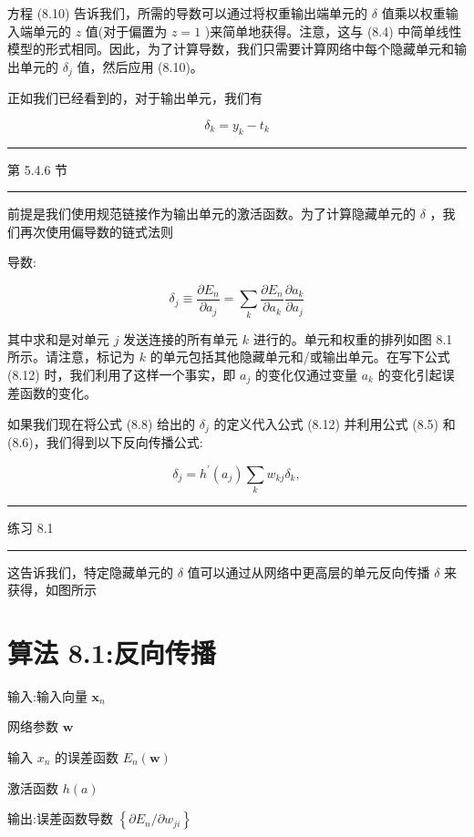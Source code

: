 \documentclass[10pt]{report}
\newcommand{\HRule}{\begin{center}\rule{0.9\linewidth}{0.2mm}\end{center}}
\begin{document}
方程 (8.10) 告诉我们，所需的导数可以通过将权重输出端单元的 \(\delta\) 值乘以权重输入端单元的 \(z\) 值(对于偏置为 \(z = 1\) )来简单地获得。注意，这与 (8.4) 中简单线性模型的形式相同。因此，为了计算导数，我们只需要计算网络中每个隐藏单元和输出单元的 \({\delta }_{j}\) 值，然后应用 (8.10)。

正如我们已经看到的，对于输出单元，我们有

\[
{\delta }_{k} = {y}_{k} - {t}_{k} \tag{8.11}
\]

\HRule

第 5.4.6 节

\HRule

前提是我们使用规范链接作为输出单元的激活函数。为了计算隐藏单元的 \(\delta\) ，我们再次使用偏导数的链式法则

导数:

\[
{\delta }_{j} \equiv  \frac{\partial {E}_{n}}{\partial {a}_{j}} = \mathop{\sum }\limits_{k}\frac{\partial {E}_{n}}{\partial {a}_{k}}\frac{\partial {a}_{k}}{\partial {a}_{j}} \tag{8.12}
\]

其中求和是对单元 \(j\) 发送连接的所有单元 \(k\) 进行的。单元和权重的排列如图 8.1 所示。请注意，标记为 \(k\) 的单元包括其他隐藏单元和/或输出单元。在写下公式 (8.12) 时，我们利用了这样一个事实，即 \({a}_{j}\) 的变化仅通过变量 \({a}_{k}\) 的变化引起误差函数的变化。

如果我们现在将公式 (8.8) 给出的 \({\delta }_{j}\) 的定义代入公式 (8.12) 并利用公式 (8.5) 和 (8.6)，我们得到以下反向传播公式:

\[
{\delta }_{j} = {h}^{\prime }\left( {a}_{j}\right) \mathop{\sum }\limits_{k}{w}_{kj}{\delta }_{k}, \tag{8.13}
\]

\HRule

练习 8.1

\HRule

这告诉我们，特定隐藏单元的 \(\delta\) 值可以通过从网络中更高层的单元反向传播 \(\delta\) 来获得，如图所示

\section*{算法 8.1:反向传播}

输入:输入向量 \({\mathbf{x}}_{n}\)

网络参数 \(\mathbf{w}\)

输入 \({x}_{n}\) 的误差函数 \({E}_{n}\left( \mathbf{w}\right)\)

激活函数 \(h\left( a\right)\)

输出:误差函数导数 \(\left\{  {\partial {E}_{n}/\partial {w}_{ji}}\right\}\)
\end{document}
